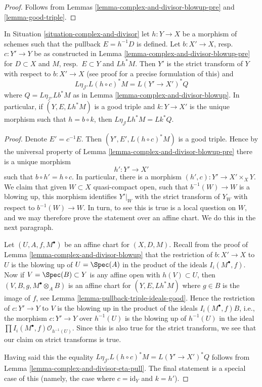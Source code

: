 \begin{proof}
Follows from Lemmas \ref{lemma-complex-and-divisor-blowup-pre}
and \ref{lemma-good-triple}.
\end{proof}

\begin{lemma}
\label{lemma-complex-and-divisor-blowup-base-change}
In Situation \ref{situation-complex-and-divisor} let $h : Y \to X$
be a morphism of schemes such that the pullback $E = h^{-1}D$
is defined. Let $b : X' \to X$, resp.\ $c : Y' \to Y$ be as constructed in
Lemma \ref{lemma-complex-and-divisor-blowup-pre} for
$D \subset X$ and $M$, resp.\ $E \subset Y$ and $Lh^*M$.
Then $Y'$ is the strict transform of $Y$ with respect to $b : X' \to X$
(see proof for a precise formulation of this) and
$$
L\eta_{\mathcal{J}'}L(h \circ c)^*M = L(Y' \to X')^*Q
$$
where $Q = L\eta_{\mathcal{I}'}Lb^*M$ as in
Lemma \ref{lemma-complex-and-divisor-blowup}.
In particular, if $(Y, E, Lh^*M)$ is a good triple and
$k : Y \to X'$ is the unique morphism such that
$h = b \circ k$, then $L\eta_\mathcal{J}Lh^*M = Lk^*Q$.
\end{lemma}

\begin{proof}
Denote $E' = c^{-1}E$. Then $(Y', E', L(h \circ c)^*M)$ is a good
triple. Hence by the universal property of
Lemma \ref{lemma-complex-and-divisor-blowup-pre}
there is a unique morphism
$$
h' : Y' \longrightarrow X'
$$
such that $b \circ h' = h \circ c$. In particular, there is a morphism
$(h', c) : Y' \to X' \times_X Y$. We claim that given $W \subset X$
quasi-compact open, such that $b^{-1}(W) \to W$ is a blowing up,
this morphism identifies $Y'|_W$ with the strict transform of $Y_W$
with respect to $b^{-1}(W) \to W$. In turn, to see this is true
is a local question on $W$, and we may therefore prove the
statement over an affine chart. We do this in the next paragraph.

\medskip\noindent
Let $(U, A, f, M^\bullet)$ be an affine chart for $(X, D, M)$.
Recall from the proof of Lemma \ref{lemma-complex-and-divisor-blowup}
that the restriction of $b : X' \to X$ to $U$ is the blowing
up of $U = \Spec(A)$ in the product of the ideals $I_i(M^\bullet, f)$.
Now if $V = \Spec(B) \subset Y$ is any affine open with $h(V) \subset U$,
then $(V, B, g, M^\bullet \otimes_A B)$ is an affine chart for
$(Y, E, Lh^*M)$ where $g \in B$ is the image of $f$, see
Lemma \ref{lemma-pullback-triple-ideals-good}.
Hence the restriction of $c : Y' \to Y$ to $V$
is the blowing up in the product of the ideals
$I_i(M^\bullet, f)B$, i.e., the morphism $c : Y' \to Y$ over
$h^{-1}(U)$ is the blowing up of $h^{-1}(U)$ in the
ideal $\prod I_i(M^\bullet, f) \mathcal{O}_{h^{-1}(U)}$.
Since this is also true for the strict transform, we see that
our claim on strict transforms is true.

\medskip\noindent
Having said this the equality
$L\eta_{\mathcal{J}'}L(h \circ c)^*M = L(Y' \to X')^*Q$
follows from
Lemma \ref{lemma-complex-and-divisor-eta-pull}.
The final statement is a special case of this
(namely, the case where $c = \text{id}_Y$ and $k = h'$).
\end{proof}

